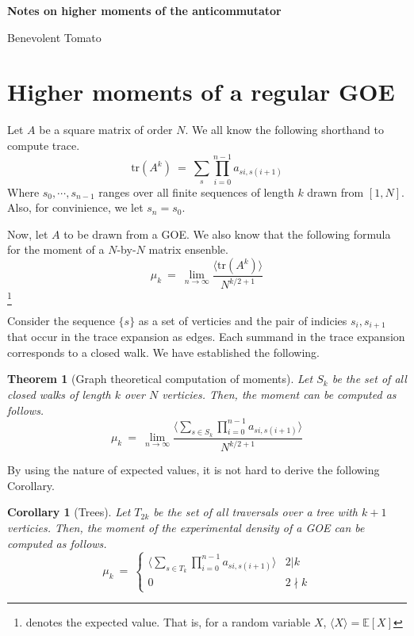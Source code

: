 \documentclass{article}
\def\<{{\langle}}
\def\>{{\rangle}}
\newcommand{\tr}{
    {
        \textrm{tr}
    }
}
\newtheorem{theorem}{Theorem}
\newtheorem{corollary}{Corollary}
\begin{document}
\begin{center}
    \Large
    \textbf{Notes on higher moments of the anticommutator}

    \large
    Benevolent Tomato
\end{center}

\section{Higher moments of a regular GOE}
Let $A$ be a square matrix of order $N$. 
We all know the following shorthand to compute trace. 
\[
    \tr(A^k) \ = \  \sum_{s} \prod_{i = 0}^{n - 1} a_{si, s(i+1)}
\]
Where $s_0, \cdots, s_{n-1}$ ranges over all finite sequences of length $k$ 
drawn from $[1, N]$. Also, for convinience, we let 
$s_n = s_0$.

Now, let $A$ to be drawn from a GOE. 
We also know that the following formula for the moment of a 
$N$-by-$N$ matrix ensenble. 
\[
\mu_k \ = \  \lim_{n \rightarrow \infty} \frac {
    \<\tr(A^k)\>
} {N^{k/2 + 1}}
\]
\footnote{denotes the expected value. That is, 
for a random variable $X$, $  \<X\>=\mathbb{E}[X] $ }

Consider the sequence $\{s\}$ as a set of verticies and 
the pair of indicies $s_i, s_{i+1}$ that occur in the trace 
expansion as edges. Each summand in the trace expansion 
corresponds to a closed walk. We have established the following. 
\begin{theorem} [Graph theoretical computation of moments]
    \label{thm:graph1}
    Let $S_k$ be the set of all closed walks of length $k$ over
    $N$ verticies. Then, the moment can be computed as follows. 
    \begin{equation}
\mu_k \ = \ \lim_{n \rightarrow \infty} \frac {\<
    \sum_{s\in S_k} \prod_{i = 0}^{n - 1} a_{si, s(i+1)}
    \>
} {N^{k/2 + 1}}
    \end{equation} 
\end{theorem}

By using the nature of expected values, it is not hard to derive 
the following Corollary. 

\begin{corollary} [Trees]
    Let $T_{2k}$ be the set of all traversals over a tree with
    \newline
    $k + 1$ verticies. Then, the moment of the 
    experimental density of a GOE can be computed as follows. 
    \begin{equation}
\mu_k \ = \  \begin{cases}\<
    \sum_{s\in T_k} \prod_{i = 0}^{n - 1} a_{si, s(i+1)}
    \>  & 2|k \\ 0 & 2 \nmid k
\end{cases}
    \end{equation} 
\end{corollary}
\end{document}
